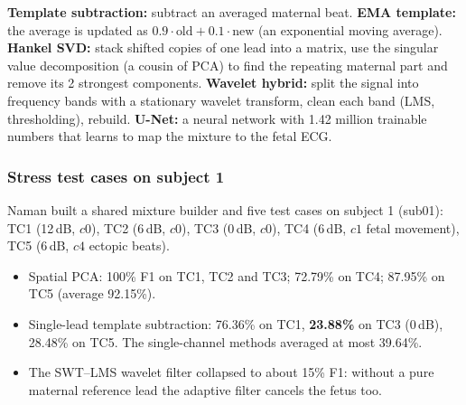 \documentclass[11pt]{article}
\begin{document}
\begin{simple}
\textbf{Template subtraction:} subtract an averaged maternal beat. \textbf{EMA template:} the average is updated as $0.9\cdot\text{old} + 0.1\cdot\text{new}$ (an exponential moving average). \textbf{Hankel SVD:} stack shifted copies of one lead into a matrix, use the singular value decomposition (a cousin of PCA) to find the repeating maternal part and remove its 2 strongest components. \textbf{Wavelet hybrid:} split the signal into frequency bands with a stationary wavelet transform, clean each band (LMS, thresholding), rebuild. \textbf{U-Net:} a neural network with 1.42 million trainable numbers that learns to map the mixture to the fetal ECG.
\end{simple}

\subsubsection{Stress test cases on subject 1}
Naman built a shared mixture builder and five test cases on subject 1 (sub01): TC1 (12\,dB, $c0$), TC2 (6\,dB, $c0$), TC3 (0\,dB, $c0$), TC4 (6\,dB, $c1$ fetal movement), TC5 (6\,dB, $c4$ ectopic beats).
\begin{itemize}
  \item Spatial PCA: 100\% F1 on TC1, TC2 and TC3; 72.79\% on TC4; 87.95\% on TC5 (average 92.15\%).
  \item Single-lead template subtraction: 76.36\% on TC1, \textbf{23.88\%} on TC3 (0\,dB), 28.48\% on TC5. The single-channel methods averaged at most 39.64\%.
  \item The SWT--LMS wavelet filter collapsed to about 15\% F1: without a pure maternal reference lead the adaptive filter cancels the fetus too.
\end{itemize}

\begin{tried}
\end{tried}
\end{document}
